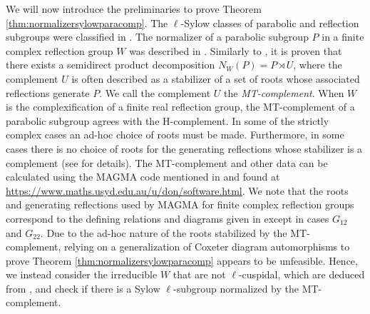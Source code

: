 \documentclass[12pt]{amsart}
\theoremstyle{plain}
\theoremstyle{definition}
\numberwithin{equation}{section}
\numberwithin{equation}{section}
\begin{document}
	We will now introduce the preliminaries to prove Theorem \ref{thm:normalizersylowparacomp}. The $\ell$-Sylow classes of parabolic and reflection subgroups were classified in \cite{METOO}. The normalizer of a parabolic subgroup $P$ in a finite complex reflection group $W$ was described in \cite{MURA}. Similarly to \cite{HOWLETT}, it is proven that there exists a semidirect product decomposition $N_W(P)=P\rtimes U$, where the complement $U$ is often described as a stabilizer of a set of roots whose associated reflections generate $P$. We call the complement $U$ the \emph{MT-complement}. When $W$ is the complexification of a finite real reflection group, the MT-complement of a parabolic subgroup agrees with the H-complement. In some of the strictly complex cases an ad-hoc choice of roots must be made. Furthermore, in some cases there is no choice of roots for the generating reflections whose stabilizer is a complement (see \cite{MURA} for details). The MT-complement and other data can be calculated using the MAGMA code mentioned in \cite{MURA} and found at \url{https://www.maths.usyd.edu.au/u/don/software.html}. We note that the roots and generating reflections used by MAGMA for finite complex reflection groups correspond to the defining relations and diagrams given in \cite[App. 2, Tables 1-5]{Complexdiagrams} except in cases $G_{12}$ and $G_{22}$. Due to the ad-hoc nature of the roots stabilized by the MT-complement, relying on a generalization of Coxeter diagram automorphisms to prove Theorem \ref{thm:normalizersylowparacomp} appears to be unfeasible. Hence, we instead consider the irreducible $W$ that are not $\ell$-cuspidal, which are deduced from \cite[Table 1]{METOO}, and check if there is a Sylow $\ell$-subgroup normalized by the MT-complement.
	
\end{document}
